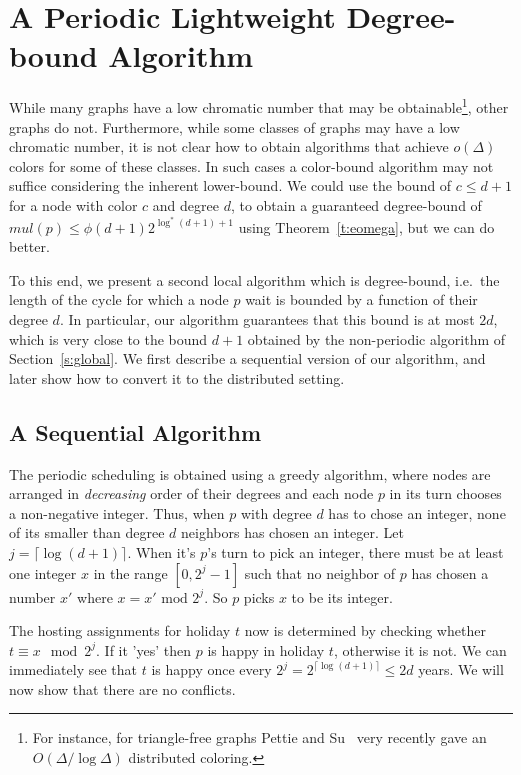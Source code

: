 \documentclass[11pt]{article}
\begin{document}
\section{A Periodic Lightweight Degree-bound Algorithm}\label{s:degree_bound}

While many graphs have a low chromatic number that may be obtainable\footnote{For instance, for triangle-free graphs Pettie and Su~\cite{PettieS13} very recently gave an $O(\Delta/\log \Delta)$ distributed coloring.}, other graphs do not. Furthermore, while some classes of graphs may have a low chromatic number, it is not clear how to obtain algorithms that achieve $o(\Delta)$ colors for some of these classes. In such cases a color-bound algorithm may not suffice considering the inherent lower-bound. We could use the bound of $c\leq d+1$ for a node with color $c$ and degree $d$, to obtain a guaranteed degree-bound of $mul(p) \leq \phi(d+1) 2^{\log^*(d+1) +1}$ using Theorem~\ref{t:eomega}, but we can do better.

To this end, we present a second local algorithm which is degree-bound, i.e.\ the length of the cycle for which a node $p$ wait is bounded by a function of their degree $d$. In particular, our algorithm guarantees that this bound is at most $2d$, which is very close to the bound $d+1$ obtained by the non-periodic algorithm of Section~\ref{s:global}. We first describe a sequential version of our algorithm, and later show how to convert it to the distributed setting.

\subsection{A Sequential Algorithm}
The periodic scheduling is obtained using a greedy algorithm, where nodes are arranged in {\em decreasing} order of their degrees and each node $p$ in its turn chooses a non-negative integer. Thus, when $p$ with degree $d$ has to chose an integer, none of its smaller than degree $d$ neighbors has chosen an integer. Let $j=\lceil \log (d+1) \rceil$. When it's $p$'s turn to pick an integer, there must be at least one integer $x$ in the range $[0,2^{j}-1]$ such that no neighbor of $p$ has chosen a number $x'$ where $x=x' \text{ mod } 2^j$. So $p$ picks $x$ to be its integer.

The hosting assignments for holiday $t$ now is determined by checking whether $t\equiv x \mod 2^j$. If it 'yes' then $p$ is happy in holiday $t$, otherwise it is not. We can immediately see that $t$ is happy once every $2^j = 2^{\lceil \log (d+1) \rceil} \leq 2d$ years. We will now show that there are no conflicts.
\end{document}
